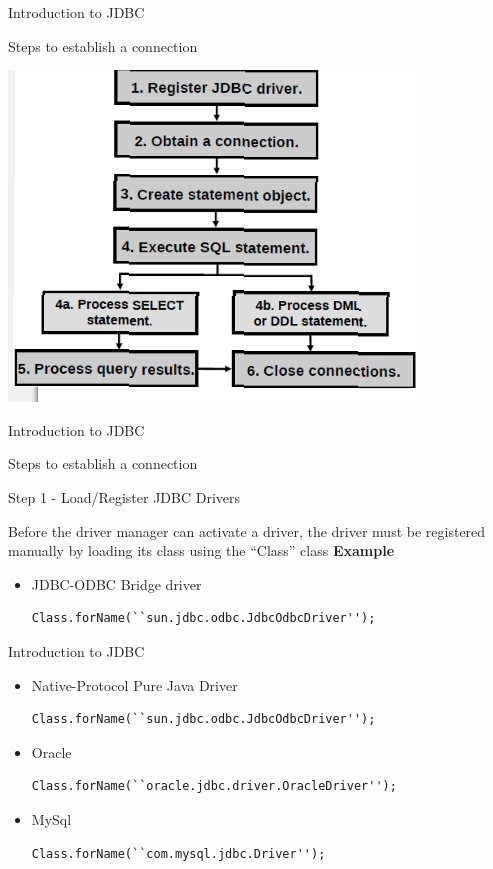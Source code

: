 \documentclass[14pt]{beamer}
\begin{document}
\begin{frame}{Introduction to JDBC}
\begin{block}{}
Steps to establish a connection 
\end{block}
\begin{center}
    \includegraphics[scale=0.5]{JEE-M03-S01-Image7.png}
  \end{center}
\end{frame}

\begin{frame}[fragile]{Introduction to JDBC}
\begin{block}{}
Steps to establish a connection 
\end{block}
\begin{block}{}
Step 1 - Load/Register JDBC Drivers
\end{block}
Before the driver manager can activate a driver, the driver must be registered manually by loading its class using the ``Class'' class
\textbf{Example}
\begin{itemize}
\item JDBC-ODBC Bridge driver
\begin{lstlisting}[numbers=none]
Class.forName(``sun.jdbc.odbc.JdbcOdbcDriver'');
\end{lstlisting}
\end{itemize}
\end{frame}
\begin{frame}[fragile]{Introduction to JDBC}
\begin{itemize}
\item Native-Protocol Pure Java Driver 
\begin{lstlisting}[numbers=none]
Class.forName(``sun.jdbc.odbc.JdbcOdbcDriver'');
\end{lstlisting}
\item Oracle 
\begin{lstlisting}[numbers=none]
Class.forName(``oracle.jdbc.driver.OracleDriver'');
\end{lstlisting}
\item MySql
\begin{lstlisting}[numbers=none]
 Class.forName(``com.mysql.jdbc.Driver'');
\end{lstlisting}
\end{itemize}
\end{frame}
\end{document}
